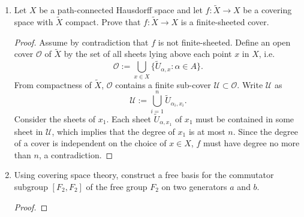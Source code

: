 \documentclass{article}
\begin{document}
\begin{enumerate}[label={\bf Q\arabic*:}]
    \begin{proof}
    \end{proof}

  \item Let $X$ be a path-connected Hausdorff space and let
    $f:\widetilde{X}\rightarrow X$ be a covering space with $\widetilde{X}$
    compact. Prove that $f:\widetilde{X}\rightarrow X$  is a
    finite-sheeted cover.

    \begin{proof}
      Assume by contradiction that $f$ is not finite-sheeted. Define an
      open cover $\mathcal{O}$ of $\widetilde{X}$ by the set of all sheets
      lying above each point $x$ in $X$, i.e.
      \begin{equation*}
        \mathcal{O} := \bigcup_{x\in X}
          \{\widetilde{U}_{\alpha,x}:\alpha\in A\}.
      \end{equation*}
      From compactness of $\widetilde{X}$, $\mathcal{O}$ contains a finite
      sub-cover $\mathcal{U}\subset\mathcal{O}$. Write $\mathcal{U}$ as
      \begin{equation*}
        \mathcal{U} := \bigcup_{i=1}^n \widetilde{U}_{\alpha_i,x_i}.
      \end{equation*}
      Consider the sheets of $x_1$. Each sheet $\widetilde{U}_{\alpha,x_1}$
      of $x_1$ must be contained in some sheet in $\mathcal{U}$, which
      implies that the degree of $x_1$ is at most $n$. Since the degree of
      a cover is independent on the choice of $x\in X$, $f$ must have
      degree no more than $n$, a contradiction.
    \end{proof}

  \item Using covering space theory, construct a free basis for the
    commutator subgroup $[F_2,F_2]$ of the free group $F_2$ on two
    generators $a$ and $b$.

    \begin{proof}
    \end{proof}
\end{enumerate}
\end{document}
